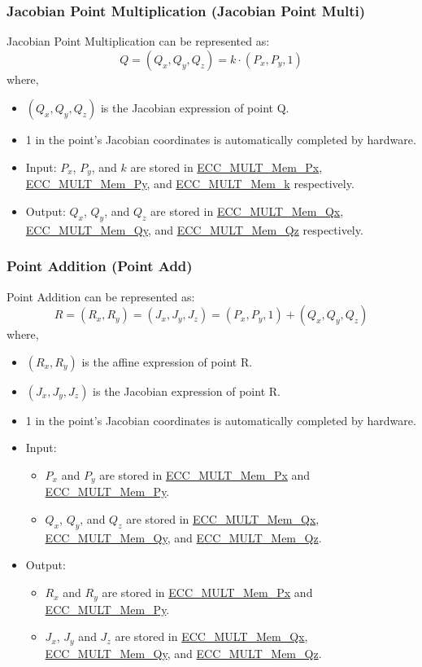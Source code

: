 \documentclass[main\_\_EN.tex]{subfiles}
\begin{document}
\subsubsection{Jacobian Point Multiplication (Jacobian Point Multi)}

Jacobian Point Multiplication can be represented as:
\[
Q = (Q_x,Q_y,Q_z) = k \cdot (P_x,P_y,1)
\]
where,
\begin{itemize}
    \item $(Q_x,Q_y,Q_z)$ is the Jacobian expression of point Q.
    \item 1 in the point's Jacobian coordinates is automatically completed by hardware.
    \item Input: $P_x$, $P_y$, and $k$ are stored in \hyperref[tab:ecc-memory]{ECC\_MULT\_Mem\_Px}, \hyperref[tab:ecc-memory]{ECC\_MULT\_Mem\_Py}, and \hyperref[tab:ecc-memory]{ECC\_MULT\_Mem\_k} respectively.
    \item Output: $Q_x$, $Q_y$, and $Q_z$ are stored in \hyperref[tab:ecc-memory]{ECC\_MULT\_Mem\_Qx}, \hyperref[tab:ecc-memory]{ECC\_MULT\_Mem\_Qy}, and \hyperref[tab:ecc-memory]{ECC\_MULT\_Mem\_Qz} respectively.
\end{itemize}

\subsubsection{Point Addition (Point Add)}

Point Addition can be represented as:
\[
R = (R_x,R_y) = (J_x,J_y,J_z) = (P_x,P_y,1) + (Q_x,Q_y,Q_z)
\]
where,
\begin{itemize}
    \item $(R_x,R_y)$ is the affine expression of point R.
    \item $(J_x,J_y,J_z)$ is the Jacobian expression of point R.
    \item 1 in the point's Jacobian coordinates is automatically completed by hardware.
    \item Input:
    \begin{itemize}
        \item $P_x$ and $P_y$ are stored in \hyperref[tab:ecc-memory]{ECC\_MULT\_Mem\_Px} and \hyperref[tab:ecc-memory]{ECC\_MULT\_Mem\_Py}.
        \item $Q_x$, $Q_y$, and $Q_z$ are stored in \hyperref[tab:ecc-memory]{ECC\_MULT\_Mem\_Qx}, \hyperref[tab:ecc-memory]{ECC\_MULT\_Mem\_Qy}, and \hyperref[tab:ecc-memory]{ECC\_MULT\_Mem\_Qz}.
    \end{itemize}
    \item Output:
    \begin{itemize}
        \item $R_x$ and $R_y$ are stored in \hyperref[tab:ecc-memory]{ECC\_MULT\_Mem\_Px} and \hyperref[tab:ecc-memory]{ECC\_MULT\_Mem\_Py}.
        \item $J_x$, $J_y$ and $J_z$ are stored in \hyperref[tab:ecc-memory]{ECC\_MULT\_Mem\_Qx}, \hyperref[tab:ecc-memory]{ECC\_MULT\_Mem\_Qy}, and \hyperref[tab:ecc-memory]{ECC\_MULT\_Mem\_Qz}.
    \end{itemize}
\end{itemize}
\end{document}
